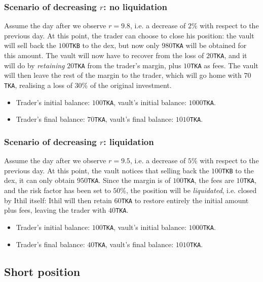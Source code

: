 \documentclass[a4paper,10 pt]{article}
\theoremstyle{definition}
\begin{document}
\subsubsection{Scenario of decreasing $r$: no liquidation}
Assume the day after we observe $r = 9.8$, i.e. a decrease of $2$\% with respect to the previous day.  At this point, the trader can choose to close his position: the vault will sell back the $100$\verb|TKB| to the dex, but now only $980$\verb|TKA| will be obtained for this amount. The vault will now have to recover from the loss of $20$\verb|TKA|, and it will do by \emph{retaining} $20$\verb|TKA| from the trader's margin, plus $10$\verb|TKA| as fees. The vault will then leave the rest of the margin to the trader, which will go home with $70$\verb|TKA|, realising a loss of $30$\% of the original investment.
\begin{itemize}
    \item Trader's initial balance: $100$\verb|TKA|, vault's initial balance: $1000$\verb|TKA|.
    \item Trader's final balance: $70$\verb|TKA|, vault's final balance: $1010$\verb|TKA|.
\end{itemize}

\subsubsection{Scenario of decreasing $r$: liquidation}
Assume the day after we observe $r = 9.5$, i.e. a decrease of $5$\% with respect to the previous day.  At this point, the vault notices that selling back the $100$\verb|TKB| to the dex, it can only obtain $950$\verb|TKA|. Since the margin is of $100$\verb|TKA|, the fees are $10$\verb|TKA|, and the risk factor has been set to $50$\%, the position will be \emph{liquidated}, i.e. closed by Ithil itself: Ithil will then retain $60$\verb|TKA| to restore entirely the initial amount plus fees, leaving the trader with $40$\verb|TKA|.
\begin{itemize}
    \item Trader's initial balance: $100$\verb|TKA|, vault's initial balance: $1000$\verb|TKA|.
    \item Trader's final balance: $40$\verb|TKA|, vault's final balance: $1010$\verb|TKA|.
\end{itemize}

\subsection{Short position}
\end{document}
